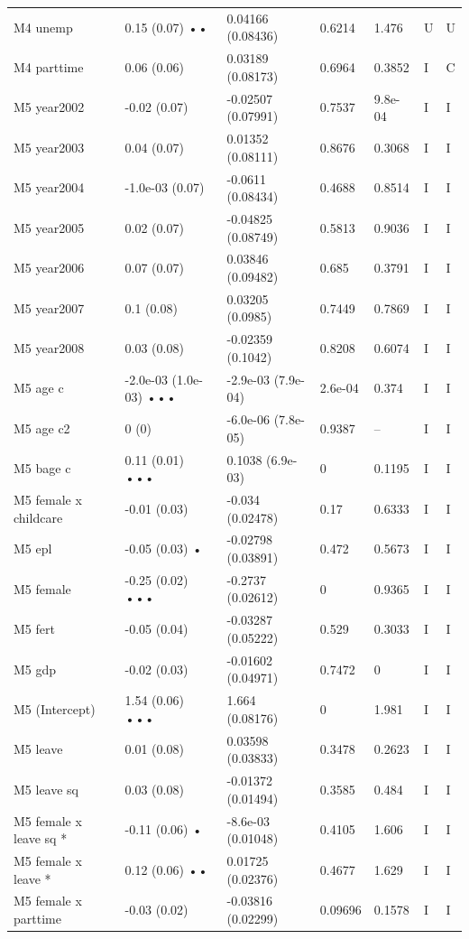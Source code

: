 {\begin{longtable}{@{}p{.245\linewidth}p{.17\linewidth}p{.17\linewidth}p{.085\linewidth}p{.060\linewidth}p{.08\linewidth}p{.07\linewidth}@{}}
M4 unemp & 0.15 (0.07) •• & 0.04166 (0.08436) & 0.6214 & 1.476 & U & U\\
M4 parttime & 0.06 (0.06) & 0.03189 (0.08173) & 0.6964 & 0.3852 & I & C\\
M5 year2002 & -0.02 (0.07) & -0.02507 (0.07991) & 0.7537 & 9.8e-04 & I & I\\
M5 year2003 & 0.04 (0.07) & 0.01352 (0.08111) & 0.8676 & 0.3068 & I & I\\
M5 year2004 & -1.0e-03 (0.07) & -0.0611 (0.08434) & 0.4688 & 0.8514 & I & I\\
M5 year2005 & 0.02 (0.07) & -0.04825 (0.08749) & 0.5813 & 0.9036 & I & I\\
M5 year2006 & 0.07 (0.07) & 0.03846 (0.09482) & 0.685 & 0.3791 & I & I\\
M5 year2007 & 0.1 (0.08) & 0.03205 (0.0985) & 0.7449 & 0.7869 & I & I\\
M5 year2008 & 0.03 (0.08) & -0.02359 (0.1042) & 0.8208 & 0.6074 & I & I\\
M5 age c & -2.0e-03 (1.0e-03) ••• & -2.9e-03 (7.9e-04) & 2.6e-04 & 0.374 & I & I\\
M5 age c2 & 0 (0) & -6.0e-06 (7.8e-05) & 0.9387 & -- & I & I\\
M5 bage c & 0.11 (0.01) ••• & 0.1038 (6.9e-03) & 0 & 0.1195 & I & I\\
M5 female x childcare & -0.01 (0.03) & -0.034 (0.02478) & 0.17 & 0.6333 & I & I\\
M5 epl & -0.05 (0.03) • & -0.02798 (0.03891) & 0.472 & 0.5673 & I & I\\
M5 female & -0.25 (0.02) ••• & -0.2737 (0.02612) & 0 & 0.9365 & I & I\\
M5 fert & -0.05 (0.04) & -0.03287 (0.05222) & 0.529 & 0.3033 & I & I\\
M5 gdp & -0.02 (0.03) & -0.01602 (0.04971) & 0.7472 & 0 & I & I\\
M5 (Intercept) & 1.54 (0.06) ••• & 1.664 (0.08176) & 0 & 1.981 & I & I\\
M5 leave & 0.01 (0.08) & 0.03598 (0.03833) & 0.3478 & 0.2623 & I & I\\
M5 leave sq & 0.03 (0.08) & -0.01372 (0.01494) & 0.3585 & 0.484 & I & I\\
M5 female x leave sq * & -0.11 (0.06) • & -8.6e-03 (0.01048) & 0.4105 & 1.606 & I & I\\
M5 female x leave * & 0.12 (0.06) •• & 0.01725 (0.02376) & 0.4677 & 1.629 & I & I\\
M5 female x parttime & -0.03 (0.02) & -0.03816 (0.02299) & 0.09696 & 0.1578 & I & I\\

\end{longtable}}
